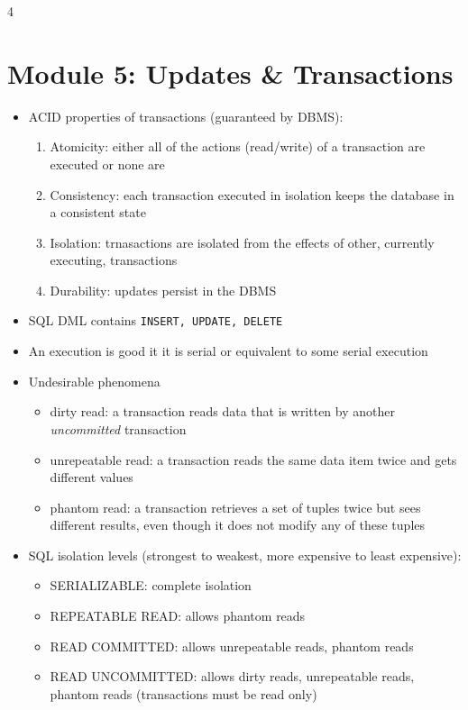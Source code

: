 \documentclass[8pt,landscape]{article}
\begin{document}
\begin{multicols*}{4}
    \section*{Module 5: Updates \& Transactions}
		\begin{itemize}[leftmargin=*]
      \item ACID properties of transactions (guaranteed by DBMS):
        \begin{enumerate}
          \item Atomicity: either all of the actions (read/write) of a transaction are executed or none are
          \item Consistency: each transaction executed in isolation keeps the database in a consistent state
          \item Isolation: trnasactions are isolated from the effects of other, currently executing, transactions
          \item Durability: updates persist in the DBMS 
          \end{enumerate}
        \item SQL DML contains \texttt{INSERT, UPDATE, DELETE}
        \item An execution is good it it is serial or equivalent to some serial execution
        \item Undesirable phenomena
          \begin{itemize}
            \item dirty read: a transaction reads data that is written by another \textit{uncommitted} transaction
            \item unrepeatable read: a transaction reads the same data item twice and gets different values
            \item phantom read: a transaction retrieves a set of tuples twice but sees different results, even though it does not modify any of these tuples
            \end{itemize}
          \item SQL isolation levels (strongest to weakest, more expensive to least expensive):
            \begin{itemize}
              \item SERIALIZABLE: complete isolation
              \item REPEATABLE READ: allows phantom reads
              \item READ COMMITTED: allows unrepeatable reads, phantom reads
              \item READ UNCOMMITTED: allows dirty reads, unrepeatable reads, phantom reads (transactions must be read only)

\end{itemize}
\end{itemize}
\end{multicols*}
\end{document}
